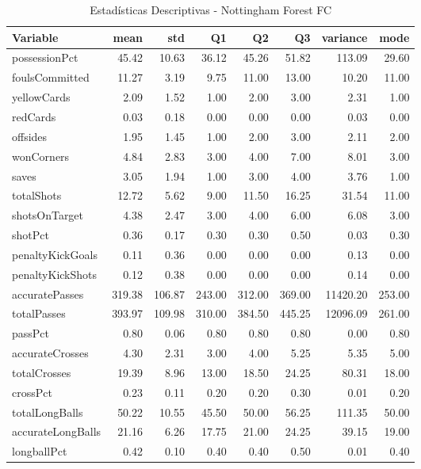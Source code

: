 \begin{table}[H]
\centering
\caption{Estadísticas Descriptivas - Nottingham Forest FC}
\label{tab:eng_nottm_forest}
\small
\begin{tabular}{lrrrrrrr}
\hline
Variable & mean & std & Q1 & Q2 & Q3 & variance & mode \\
\hline
possessionPct & 45.42 & 10.63 & 36.12 & 45.26 & 51.82 & 113.09 & 29.60 \\
foulsCommitted & 11.27 & 3.19 & 9.75 & 11.00 & 13.00 & 10.20 & 11.00 \\
yellowCards & 2.09 & 1.52 & 1.00 & 2.00 & 3.00 & 2.31 & 1.00 \\
redCards & 0.03 & 0.18 & 0.00 & 0.00 & 0.00 & 0.03 & 0.00 \\
offsides & 1.95 & 1.45 & 1.00 & 2.00 & 3.00 & 2.11 & 2.00 \\
wonCorners & 4.84 & 2.83 & 3.00 & 4.00 & 7.00 & 8.01 & 3.00 \\
saves & 3.05 & 1.94 & 1.00 & 3.00 & 4.00 & 3.76 & 1.00 \\
totalShots & 12.72 & 5.62 & 9.00 & 11.50 & 16.25 & 31.54 & 11.00 \\
shotsOnTarget & 4.38 & 2.47 & 3.00 & 4.00 & 6.00 & 6.08 & 3.00 \\
shotPct & 0.36 & 0.17 & 0.30 & 0.30 & 0.50 & 0.03 & 0.30 \\
penaltyKickGoals & 0.11 & 0.36 & 0.00 & 0.00 & 0.00 & 0.13 & 0.00 \\
penaltyKickShots & 0.12 & 0.38 & 0.00 & 0.00 & 0.00 & 0.14 & 0.00 \\
accuratePasses & 319.38 & 106.87 & 243.00 & 312.00 & 369.00 & 11420.20 & 253.00 \\
totalPasses & 393.97 & 109.98 & 310.00 & 384.50 & 445.25 & 12096.09 & 261.00 \\
passPct & 0.80 & 0.06 & 0.80 & 0.80 & 0.80 & 0.00 & 0.80 \\
accurateCrosses & 4.30 & 2.31 & 3.00 & 4.00 & 5.25 & 5.35 & 5.00 \\
totalCrosses & 19.39 & 8.96 & 13.00 & 18.50 & 24.25 & 80.31 & 18.00 \\
crossPct & 0.23 & 0.11 & 0.20 & 0.20 & 0.30 & 0.01 & 0.20 \\
totalLongBalls & 50.22 & 10.55 & 45.50 & 50.00 & 56.25 & 111.35 & 50.00 \\
accurateLongBalls & 21.16 & 6.26 & 17.75 & 21.00 & 24.25 & 39.15 & 19.00 \\
longballPct & 0.42 & 0.10 & 0.40 & 0.40 & 0.50 & 0.01 & 0.40 \\

\end{tabular}
\end{table}
